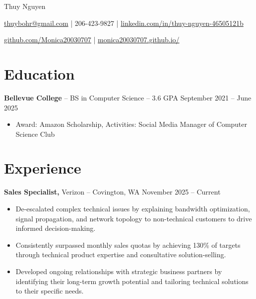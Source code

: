 \documentclass[11pt]{article}       %
\begin{document}
\centerline{\Huge Thuy Nguyen}

\vspace{5pt}

\centerline{\href{mailto:thuybohr@gmail.com}{thuybohr@gmail.com} | 206-423-9827 |
\href{https://www.linkedin.com/in/thuy-nguyen-46505121b/}{linkedin.com/in/thuy-nguyen-46505121b}}

\centerline{\href{https://github.com/Monica20030707}{github.com/Monica20030707} | 
\href{https://monica20030707.github.io/}{monica20030707.github.io/}} 

\vspace{-9pt}

\section*{Education}
\textbf{Bellevue College} -- BS in Computer Science -- 3.6 GPA \hfill September 2021 -- June 2025\\
\vspace{-9pt}
\begin{itemize}
  \item Award: Amazon Scholarship, Activities: Social Media Manager of Computer Science Club
\end{itemize}

\vspace{-18.5pt}

\section*{Experience}

\textbf{Sales Specialist,} {Verizon} -- Covington, WA \hfill November 2025 -- Current \\
\vspace{-9pt}
\begin{itemize}
  \item De-escalated complex technical issues by explaining bandwidth optimization, signal propagation, and network topology to non-technical customers to drive informed decision-making.
  \item Consistently surpassed monthly sales quotas by achieving 130\% of targets through technical product expertise and consultative solution-selling.
  \item Developed ongoing relationships with strategic business partners by identifying their long-term growth potential and tailoring technical solutions to their specific needs.
\end{itemize}
\end{document}
